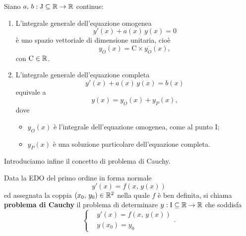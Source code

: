 \documentclass[../../analisi2]{subfiles}
\begin{document}
        \begin{teorema}
            Siano \(a, \, b : \mathrm{J} \subseteq \mathbb{R} \to \mathbb{R}\) continue:
            \begin{enumerate}
                \item L'integrale generale dell'equazione omogenea
                    \[
                        y'(x) + a(x) \, y(x) = 0
                    \]
                    è uno spazio vettoriale di dimensione unitaria, cioè
                    \[
                        y_O(x) = \mathrm{C} \times \overline{y_O}(x),
                    \]
                    con \(\mathrm{C} \in \mathbb{R}\).
                \item L'integrale generale dell'equazione completa
                    \[
                        y'(x) + a(x) \, y(x) = b(x)
                    \]
                    equivale a
                    \[
                        y(x) = y_O(x) + y_P(x),
                    \]
                    dove
                    \begin{itemize}
                        \item \(y_O(x)\) è l'integrale dell'equazione omogenea, come al punto I;
                        \item \(y_P(x)\) è una soluzione particolare dell'equazione completa.
                    \end{itemize}
            \end{enumerate}
        \end{teorema}

        Introduciamo infine il concetto di problema di Cauchy.

        \begin{definizione}
            Data la EDO del primo ordine in forma normale
            \[
                y'(x) = f\left(x, \, y(x)\right)
            \]
            ed assegnata la coppia \((x_0, \, y_0) \in \mathbb{R}^2\) nella quale \(f\) è ben definita, si chiama \textbf{problema di Cauchy}
            il problema di determinare \(y : \mathrm{I} \subseteq \mathbb{R} \to \mathbb{R}\) che soddisfa
            \[
                \left\{
                    \begin{aligned}
                        &y'(x) = f \left(x, \, y(x)\right)\\
                        &y(x_0) = y_0
                    \end{aligned}
                \right.
                .
            \]
        \end{definizione}
            
\end{document}

